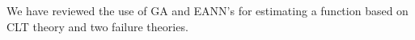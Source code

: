We have reviewed the use of GA and EANN's for estimating a function based on CLT
theory and two failure theories.
